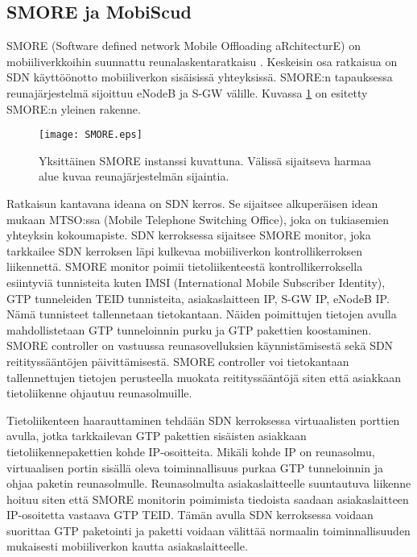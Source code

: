 
\subsection{SMORE ja MobiScud} \label{smore}
SMORE (Software defined network Mobile Offloading aRchitecturE) on mobiiliverkkoihin suunnattu reunalaskentaratkaisu \cite{cho2014smore}.
Keskeisin osa ratkaisua on SDN käyttöönotto mobiiliverkon sisäisissä yhteyksissä.
SMORE:n tapauksessa reunajärjestelmä sijoittuu eNodeB ja S-GW välille. Kuvassa \ref{fig:smore} on esitetty SMORE:n yleinen rakenne.

\begin{figure}[tb]
\texttt{[image: SMORE.eps]}
\caption{Yksittäinen SMORE instanssi kuvattuna. Välissä sijaitseva harmaa alue kuvaa reunajärjestelmän sijaintia.} \label{fig:smore}
\end{figure}


Ratkaisun kantavana ideana on SDN kerros. Se sijaitsee alkuperäisen idean mukaan MTSO:ssa (Mobile Telephone Switching Office), joka on tukiasemien yhteyksin kokoumapiste.
SDN kerroksessa sijaitsee SMORE monitor, joka tarkkailee SDN kerroksen läpi kulkevaa mobiiliverkon kontrollikerroksen liikennettä. SMORE monitor poimii tietoliikenteestä kontrollikerroksella esiintyviä tunnisteita kuten IMSI (International Mobile Subscriber Identity), GTP tunneleiden TEID tunnisteita, asiakaslaitteen IP, S-GW IP, eNodeB IP. Nämä tunnisteet tallennetaan tietokantaan.
Näiden poimittujen tietojen avulla mahdollistetaan GTP tunneloinnin purku ja GTP pakettien koostaminen.
SMORE controller on vastuussa reunasovelluksien käynnistämisestä sekä SDN reitityssääntöjen päivittämisestä. SMORE controller voi tietokantaan tallennettujen tietojen perusteella muokata reitityssääntöjä siten että asiakkaan tietoliikenne ohjautuu reunasolmuille. 

Tietoliikenteen haarauttaminen tehdään SDN kerroksessa virtuaalisten porttien avulla, jotka tarkkailevan GTP pakettien sisäisten asiakkaan tietoliikennepakettien kohde IP-osoitteita. Mikäli kohde IP on reunasolmu, virtuaalisen portin sisällä oleva toiminnallisuus purkaa GTP tunneloinnin ja ohjaa paketin reunasolmulle. Reunasolmulta asiakaslaitteelle suuntautuva liikenne hoituu siten että SMORE monitorin poimimista tiedoista saadaan asiakaslaitteen IP-osoitetta vastaava GTP TEID.
Tämän avulla SDN kerroksessa voidaan suorittaa GTP paketointi ja paketti voidaan välittää normaalin toiminnallisuuden mukaisesti mobiiliverkon kautta asiakaslaitteelle. 

